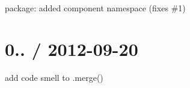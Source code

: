 
\begin{DoxyItemize}
\item package\+: added {\ttfamily component} namespace (fixes \#1)
\end{DoxyItemize}

\section*{0.. / 2012-\/09-\/20 }


\begin{DoxyItemize}
\item add code smell to {\ttfamily .merge()} 
\end{DoxyItemize}